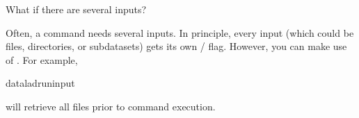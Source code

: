 \ignorespaces \begin{findoutmore}[label={fom-run-multiple-inputs}, before title={\thetcbcounter\ }, float, floatplacement=tb, check odd page=true]{What if there are several inputs?}
\label{\detokenize{basics/101-110-run2:fom-run-multiple-inputs}}

\sphinxAtStartPar
Often, a command needs several inputs. In principle, every input (which could be files, directories, or subdatasets) gets its own /
flag. However, you can make use of {\hyperref[\detokenize{glossary:term-globbing}]{}}. For example,

\begin{sphinxVerbatim}[commandchars=\\\{\}]
dataladrun\PYGZhy{}\PYGZhy{}input
\end{sphinxVerbatim}

\sphinxAtStartPar
will retrieve all  files prior to command execution.


\end{findoutmore}


